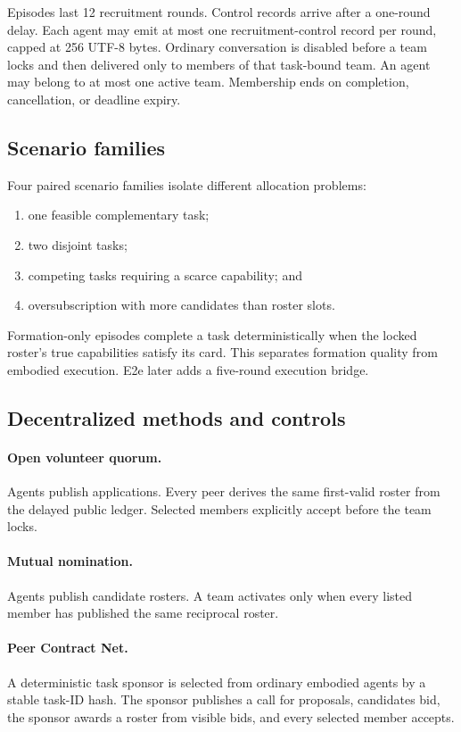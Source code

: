 \documentclass[11pt]{article}
\begin{document}
Episodes last 12 recruitment rounds.  Control records arrive after a one-round
delay.  Each agent may emit at most one recruitment-control record per round,
capped at 256 UTF-8 bytes.  Ordinary conversation is disabled before a team
locks and then delivered only to members of that task-bound team.  An agent may
belong to at most one active team.  Membership ends on completion,
cancellation, or deadline expiry.

\subsection{Scenario families}

Four paired scenario families isolate different allocation problems:

\begin{enumerate}
  \item one feasible complementary task;
  \item two disjoint tasks;
  \item competing tasks requiring a scarce capability; and
  \item oversubscription with more candidates than roster slots.
\end{enumerate}

Formation-only episodes complete a task deterministically when the locked
roster's true capabilities satisfy its card.  This separates formation quality
from embodied execution.  E2e later adds a five-round execution bridge.

\subsection{Decentralized methods and controls}

\paragraph{Open volunteer quorum.}
Agents publish applications.  Every peer derives the same first-valid roster
from the delayed public ledger.  Selected members explicitly accept before the
team locks.

\paragraph{Mutual nomination.}
Agents publish candidate rosters.  A team activates only when every listed
member has published the same reciprocal roster.

\paragraph{Peer Contract Net.}
A deterministic task sponsor is selected from ordinary embodied agents by a
stable task-ID hash.  The sponsor publishes a call for proposals, candidates
bid, the sponsor awards a roster from visible bids, and every selected member
accepts.
\end{document}
